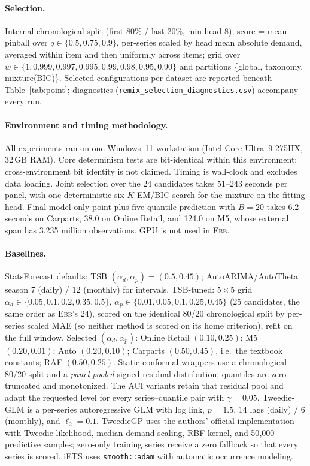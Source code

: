 \documentclass[twoside]{article}
\theoremstyle{definition}
\newcommand{\EBB}{\textsc{Ebb}}
\begin{document}
\paragraph{Selection.} Internal chronological split (first 80\% / last
20\%, min head 8); score = mean pinball over $q\in\{0.5,0.75,0.9\}$,
per-series scaled by head mean absolute demand, averaged within item and then
uniformly across items; grid over
$w\in\{1,0.999,0.997,0.995,0.99,0.98,0.95,0.90\}$ and partitions
\{global, taxonomy, mixture(BIC)\}. Selected configurations per dataset
are reported beneath Table~\ref{tab:point}; diagnostics
(\texttt{remix\_selection\_diagnostics.csv}) accompany every run.

\paragraph{Environment and timing methodology.} All experiments ran on one
Windows~11 workstation (Intel Core Ultra~9 275HX, 32\,GB RAM). Core
determinism tests are bit-identical within this environment;
cross-environment bit identity is not claimed. Timing is wall-clock and
excludes data loading. Joint selection over the 24 candidates takes
$51$--$243$ seconds per panel, with one deterministic six-$K$ EM/BIC
search for the mixture on the fitting head. Final model-only point plus
five-quantile prediction with $B=20$ takes 6.2 seconds on
Carparts, 38.0 on Online Retail, and 124.0 on M5, whose
external span has 3.235 million observations. GPU is not used in \EBB{}.

\paragraph{Baselines.} StatsForecast defaults; TSB
$(\alpha_d,\alpha_p)=(0.5,0.45)$; AutoARIMA/AutoTheta season 7 (daily) /
12 (monthly) for intervals. TSB-tuned: $5\times5$ grid
$\alpha_d\in\{0.05,0.1,0.2,0.35,0.5\}$,
$\alpha_p\in\{0.01,0.05,0.1,0.25,0.45\}$ (25 candidates, the same order
as \EBB{}'s 24), scored on the identical 80/20 chronological split by
per-series scaled MAE (so neither method is scored on its home
criterion), refit on the full window. Selected $(\alpha_d,\alpha_p)$:
Online Retail $(0.10,0.25)$; M5 $(0.20,0.01)$; Auto $(0.20,0.10)$;
Carparts $(0.50,0.45)$, i.e.\ the textbook constants; RAF
$(0.50,0.25)$. Static conformal wrappers use a chronological 80/20 split
and a \emph{panel-pooled} signed-residual distribution; quantiles are
zero-truncated and monotonized. The ACI variants retain that residual
pool and adapt the requested level for every series--quantile pair with
$\gamma=0.05$. Tweedie-GLM is a per-series autoregressive GLM with log
link, $p{=}1.5$, 14 lags (daily) / 6 (monthly), and $\ell_2{=}0.1$.
TweedieGP uses the authors' official implementation with Tweedie
likelihood, median-demand scaling, RBF kernel, and 50{,}000 predictive
samples; zero-only training series receive a zero fallback so that every
series is scored. iETS uses \texttt{smooth::adam} with automatic
occurrence modeling.
\end{document}
